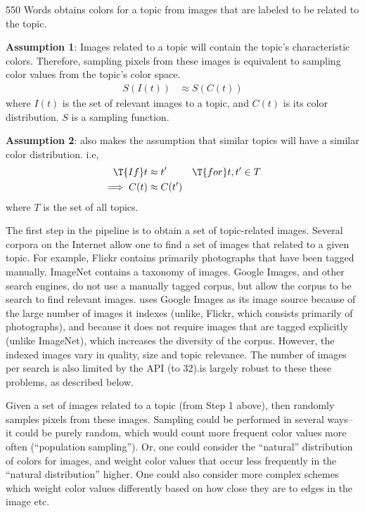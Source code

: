 550 Words
\system obtains colors for a topic from images that are labeled to be related to the topic. 

\textbf {Assumption 1}: Images related to a topic will contain the topic's characteristic colors. Therefore, sampling pixels from these images is equivalent to sampling color values from the topic's color space. 
\begin{align}
S(I(t)) &\approx S(C(t))
\end{align} 
where $I(t)$ is the set of relevant images to a topic, and $C(t)$ is its color distribution. $S$ is a sampling function.

\textbf{Assumption 2}: \system also makes the assumption that similar topics will have a similar color distribution. i.e, 
\begin{align*}
\T{If } t &\approx t' & \T{for } t, t' \in T \\
\implies C(t) &\approx C(t')
\end{align*} 
where $T$ is the set of all topics.


The first step in the \system pipeline is to obtain a set of topic-related images. Several corpora on the Internet allow one to find a set of images that related to a given topic. For example, Flickr contains primarily photographs that have been tagged manually. ImageNet contains a taxonomy of images.  Google Images, and other search engines, do not use a manually tagged corpus, but allow the corpus to be search to find relevant images. \system uses Google Images as its image source because of the large number of images it indexes (unlike, Flickr, which consists primarily of photographs), and because it does not require images that are tagged explicitly (unlike ImageNet), which increases the diversity of the corpus. However, the indexed images vary in quality, size and topic relevance. The number of images per search is also limited by the API (to 32).\system is largely robust to these these problems, as described below. 

Given a set of images related to a topic (from Step 1 above), \system then randomly samples pixels from these images. Sampling could be performed in several ways-- it could be purely random, which would count more frequent color values more often  (``population sampling''). Or, one could consider the ``natural'' distribution of colors for images, and weight color values that occur less frequently in the ``natural distribution'' higher. One could also consider more complex schemes which weight color values differently based on how close they are to edges in the image etc.

